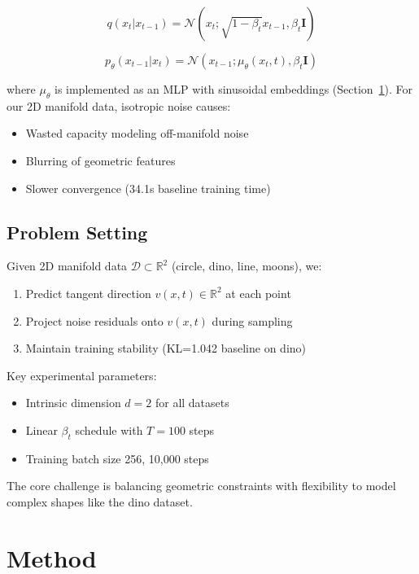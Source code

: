 \documentclass[final]{iclr2024_conference}
\begin{document}
\begin{equation}
    q(x_t|x_{t-1}) = \mathcal{N}(x_t; \sqrt{1-\beta_t}x_{t-1}, \beta_t\mathbf{I})
\end{equation}

\begin{equation}
    p_\theta(x_{t-1}|x_t) = \mathcal{N}(x_{t-1}; \mu_\theta(x_t,t), \beta_t\mathbf{I})
\end{equation}

where $\mu_\theta$ is implemented as an MLP with sinusoidal embeddings (Section~\ref{sec:method}). For our 2D manifold data, isotropic noise causes:

\begin{itemize}
    \item Wasted capacity modeling off-manifold noise
    \item Blurring of geometric features
    \item Slower convergence (34.1s baseline training time)
\end{itemize}

\subsection{Problem Setting}
Given 2D manifold data $\mathcal{D} \subset \mathbb{R}^2$ (circle, dino, line, moons), we:

\begin{enumerate}
    \item Predict tangent direction $v(x,t) \in \mathbb{R}^2$ at each point
    \item Project noise residuals onto $v(x,t)$ during sampling
    \item Maintain training stability (KL=1.042 baseline on dino)
\end{enumerate}

Key experimental parameters:
\begin{itemize}
    \item Intrinsic dimension $d=2$ for all datasets
    \item Linear $\beta_t$ schedule with $T=100$ steps
    \item Training batch size 256, 10,000 steps
\end{itemize}

The core challenge is balancing geometric constraints with flexibility to model complex shapes like the dino dataset.

\section{Method}
\label{sec:method}
\end{document}
